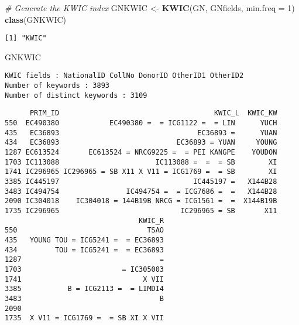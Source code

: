 \documentclass[
]{article}
\newenvironment{Shaded}{\begin{snugshade}}{\end{snugshade}}
\newcommand{\CommentTok}[1]{\textcolor[rgb]{0.56,0.35,0.01}{\textit{#1}}}
\newcommand{\DataTypeTok}[1]{\textcolor[rgb]{0.13,0.29,0.53}{#1}}
\newcommand{\DecValTok}[1]{\textcolor[rgb]{0.00,0.00,0.81}{#1}}
\newcommand{\KeywordTok}[1]{\textcolor[rgb]{0.13,0.29,0.53}{\textbf{#1}}}
\newcommand{\NormalTok}[1]{#1}
\newcommand{\OperatorTok}[1]{\textcolor[rgb]{0.81,0.36,0.00}{\textbf{#1}}}
\newcommand{\OtherTok}[1]{\textcolor[rgb]{0.56,0.35,0.01}{#1}}
\newcommand{\StringTok}[1]{\textcolor[rgb]{0.31,0.60,0.02}{#1}}
\begin{document}
\begin{Shaded}
\begin{Highlighting}[]
\CommentTok{# Generate the KWIC index}
\NormalTok{GNKWIC <-}\StringTok{ }\KeywordTok{KWIC}\NormalTok{(GN, GNfields, }\DataTypeTok{min.freq =} \DecValTok{1}\NormalTok{)}
\KeywordTok{class}\NormalTok{(GNKWIC)}
\end{Highlighting}
\end{Shaded}

\begin{verbatim}
[1] "KWIC"
\end{verbatim}

\begin{Shaded}
\begin{Highlighting}[]
\NormalTok{GNKWIC}
\end{Highlighting}
\end{Shaded}

\begin{verbatim}
KWIC fields : NationalID CollNo DonorID OtherID1 OtherID2
Number of keywords : 3893
Number of distinct keywords : 3109
\end{verbatim}

\begin{Shaded}
\end{Shaded}

\begin{verbatim}
      PRIM_ID                                     KWIC_L  KWIC_KW
550  EC490380            EC490380 =  = ICG1122 =  = LIN      YUCH
435   EC36893                                 EC36893 =      YUAN
434   EC36893                            EC36893 = YUAN     YOUNG
1287 EC613524       EC613524 = NRCG9225 =  = PEI KANGPE    YOUDON
1703 IC113088                       IC113088 =  =  = SB        XI
1741 IC296965 IC296965 = SB X11 X V11 = ICG1769 =  = SB        XI
3385 IC445197                                IC445197 =   X144B28
3483 IC494754                IC494754 =  = ICG7686 =  =   X144B28
2090 IC304018    IC304018 = 144B19B NRCG = ICG1561 =  =  X144B19B
1735 IC296965                             IC296965 = SB       X11
                                KWIC_R
550                               TSAO
435   YOUNG TOU = ICG5241 =  = EC36893
434         TOU = ICG5241 =  = EC36893
1287                                 =
1703                        = IC305003
1741                             X VII
3385           B = ICG2113 =  = LIMDI4
3483                                 B
2090                                  
1735  X V11 = ICG1769 =  = SB XI X VII
\end{verbatim}
\end{document}

